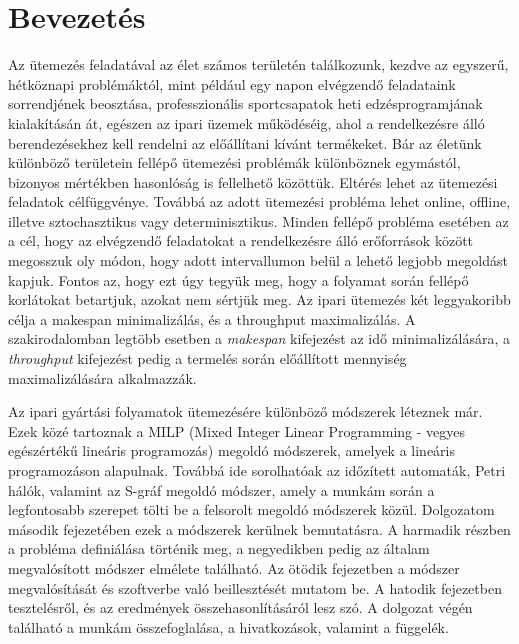 \chapter{Bevezetés}
Az ütemezés feladatával az élet számos területén találkozunk, kezdve az egyszerű, hétköznapi problémáktól, mint például egy napon elvégzendő feladataink sorrendjének beosztása, professzionális sportcsapatok heti edzésprogramjának kialakításán át, egészen az ipari üzemek működéséig, ahol a rendelkezésre álló berendezésekhez kell rendelni az előállítani kívánt termékeket.
Bár az életünk különböző területein fellépő ütemezési problémák különböznek egymástól, bizonyos mértékben hasonlóság is fellelhető közöttük.
Eltérés lehet az ütemezési feladatok célfüggvénye.
Továbbá az adott ütemezési probléma lehet online, offline, illetve sztochasztikus vagy determinisztikus.
Minden fellépő probléma esetében az a cél, hogy az elvégzendő feladatokat a rendelkezésre álló erőforrások között megosszuk oly módon, hogy adott intervallumon belül a lehető legjobb megoldást kapjuk.
Fontos az, hogy ezt úgy tegyük meg, hogy a folyamat során fellépő korlátokat betartjuk, azokat nem sértjük meg.
Az ipari ütemezés két leggyakoribb célja a makespan minimalizálás, és a throughput maximalizálás.
A szakirodalomban legtöbb esetben a \textit{makespan} kifejezést az idő minimalizálására, a \textit{throughput} kifejezést pedig a termelés során előállított mennyiség maximalizálására alkalmazzák.

Az ipari gyártási folyamatok ütemezésére különböző módszerek léteznek már.
Ezek közé tartoznak a MILP (Mixed Integer Linear Programming - vegyes egészértékű lineáris programozás) megoldó módszerek, amelyek a lineáris programozáson alapulnak.
Továbbá ide sorolhatóak az időzített automaták, Petri hálók, valamint az S-gráf megoldó módszer, amely a munkám során a legfontosabb szerepet tölti be a felsorolt megoldó módszerek közül.
Dolgozatom második fejezetében ezek a módszerek kerülnek bemutatásra.
A harmadik részben a probléma definiálása történik meg, a negyedikben pedig az általam megvalósított módszer elmélete található.
Az ötödik fejezetben a módszer megvalósítását és szoftverbe való beillesztését mutatom be.
A hatodik fejezetben tesztelésről, és az eredmények összehasonlításáról lesz szó.
A dolgozat végén található a munkám összefoglalása, a hivatkozások, valamint a függelék.